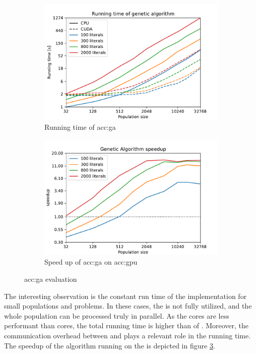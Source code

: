 \begin{figure}[t]
    \begin{subfigure}[t]{0.48\textwidth}
        \includegraphics[width=\textwidth]{img/runs/time_ga_with_legend.pdf}
        \caption{Running time of \acrshort*{acc:ga}}
        \label{fig:garunningtime}
    \end{subfigure}
    \hfill
    \begin{subfigure}[t]{0.48\textwidth}
        \includegraphics[width=\textwidth]{img/runs/speedup_ga.pdf}
        \caption{Speed up of \acrshort*{acc:ga} on \acrshort*{acc:gpu}}
        \label{fig:gpugaspeedup}
    \end{subfigure}
    
    \caption{\acrlong*{acc:ga} evaluation}
\end{figure}

The interesting observation is the constant run time of the \gpu implementation for small populations and problems. In these cases, the \gpu is not fully utilized, and the whole population can be processed truly in parallel. As the \cuda cores are less performant than \cpu cores, the total running time is higher than of \cpuns. Moreover, the communication overhead between \cpu and \gpu plays a relevant role in the running time. The speedup of the algorithm running on the \gpu is depicted in figure \ref{fig:gpugaspeedup}.

